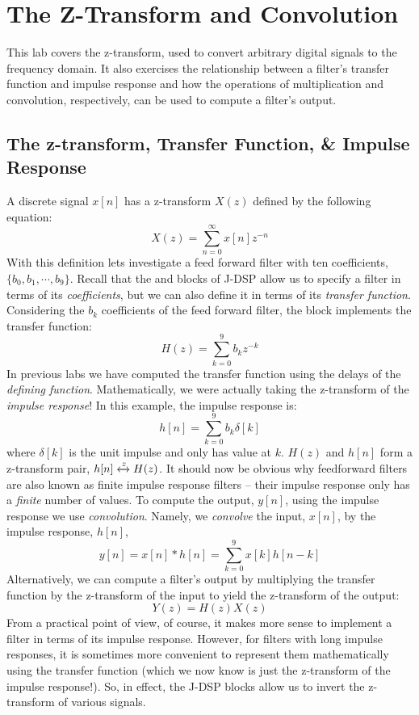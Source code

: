 
\section{The Z-Transform and Convolution}

This lab covers the z-transform, used to convert arbitrary digital
signals to the frequency domain. It also exercises the relationship
between a filter's transfer function and impulse response and how the
operations of multiplication and convolution, respectively, can be
used to compute a filter's output.

\subsection{The z-transform, Transfer Function, \& Impulse Response}

A discrete signal $x[n]$ has a z-transform $X(z)$ defined by the
following equation:
\[
X(z)=\sum_{n=0}^{\infty}x[n]z^{-n}
\]
With this definition lets investigate a feed forward filter with ten
coefficients, $\{b_0, b_1,\cdots, b_9\}$.  Recall that the
 and  blocks of J-DSP allow us to specify
a filter in terms of its \emph{coefficients}, but we can also define
it in terms of its \emph{transfer function}. Considering the $b_k$
coefficients of the feed forward filter, the  block
implements the transfer function:
\begin{equation}
  H(z) = \sum_{k=0}^{9} b_k z^{-k}
\end{equation}
In previous labs we have computed the transfer function using the
delays of the \emph{defining function}.  Mathematically, we were
actually taking the z-transform of the \emph{impulse response}!  In
this example, the impulse response is:
\begin{equation}
  h[n] = \sum_{k=0}^{9} b_k \delta[k]
\end{equation}
where $\delta[k]$ is the unit impulse and only has value at
$k$. $H(z)$ and $h[n]$ form a z-transform pair,
$h[n]\xleftrightarrow{z} H(z)$. It should now be obvious why
feedforward filters are also known as finite impulse response filters
-- their impulse response only has a \emph{finite} number of
values. To compute the output, $y[n]$, using the impulse response we
use \emph{convolution}. Namely, we \emph{convolve} the input, $x[n]$,
by the impulse response, $h[n]$,
\begin{equation}
  y[n] = x[n] \ast h[n]  = \sum_{k=0}^{9}x[k]h[n-k]
\end{equation}
Alternatively, we can compute a filter's output by multiplying the
transfer function by the z-transform of the input to yield the
z-transform of the output:
\begin{equation}
  Y(z) = H(z) X(z)
\end{equation}
From a practical point of view, of course, it makes more sense to
implement a filter in terms of its impulse response. However, for
filters with long impulse responses, it is sometimes more convenient
to represent them mathematically using the transfer function (which we
now know is just the z-transform of the impulse response!).  So, in
effect, the J-DSP blocks allow us to invert the z-transform of various
signals.

